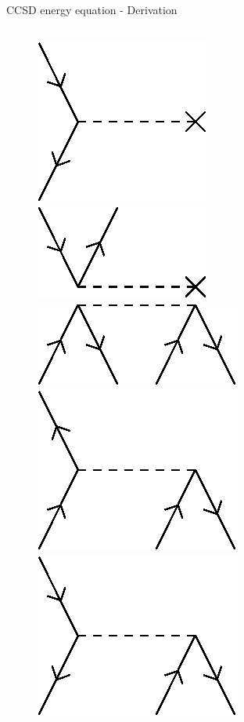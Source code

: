 \begin{frame}{CCSD energy equation - Derivation }
\begin{columns}[t]
\begin{figure}
        \parbox{0.20\textwidth}{
            \centering
            \includegraphics[scale=0.35]{graphics/f3}} 
        \parbox{0.20\textwidth}{
            \centering
            \includegraphics[scale=0.35]{graphics/f4}} 
        \parbox{0.20\textwidth}{
            \centering
            \includegraphics[scale=0.35]{graphics/v1}} 
        \parbox{0.20\textwidth}{
            \centering
            \includegraphics[scale=0.35]{graphics/v2}} 
        \parbox{0.20\textwidth}{
            \centering
            \includegraphics[scale=0.35]{graphics/v3}} 

\end{figure}
\end{columns}
\end{frame}
